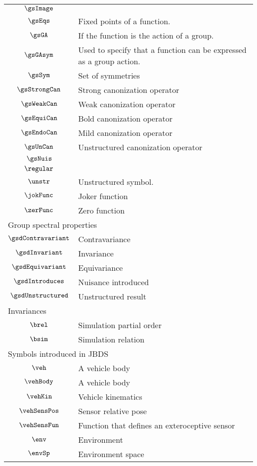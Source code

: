 \begin{longtable}{cl}
 $\gsImage$ &  \\ 
 $\gsEqs$ &  Fixed points of a function.\\ 
 $\gsGA$ &  If the function is the action of a group.\\ 
 $\gsGAsym$ &  Used to specify that a function can be expressed as a group action.\\ 
 $\gsSym$ &  Set of symmetries\\ 
 $\gsStrongCan$ &  Strong canonization operator\\ 
 $\gsWeakCan$ &  Weak canonization operator\\ 
 $\gsEquiCan$ &  Bold canonization operator\\ 
 $\gsEndoCan$ &  Mild canonization operator\\ 
 $\gsUnCan$ &  Unstructured canonization operator\\ 
 $\gsNuis$ &  \\ 
 $\regular$ & \\ 
 $\unstr$ &  Unstructured symbol.\\ 
 $\jokFunc$ &  Joker function\\ 
 $\zerFunc$ &  Zero function\\ 
 \multicolumn{2}{l}{Group spectral properties}\\ 
 \hline
$\gsdContravariant$ &  Contravariance\\ 
 $\gsdInvariant$ &  Invariance\\ 
 $\gsdEquivariant$ &  Equivariance\\ 
 $\gsdIntroduces$ &  Nuisance introduced\\ 
 $\gsdUnstructured$ &  Unstructured result\\ 
 \multicolumn{2}{l}{Invariances}\\ 
 \hline
$\brel$ &  Simulation partial order\\ 
 $\bsim$ &  Simulation relation\\ 
 \multicolumn{2}{l}{Symbols introduced in JBDS}\\ 
 \hline
$\veh$ &  A vehicle body\\ 
 $\vehBody$ &  A vehicle body\\ 
 $\vehKin$ &  Vehicle kinematics \\ 
 $\vehSensPos$ &  Sensor relative pose\\ 
 $\vehSensFun$ &  Function that defines an exteroceptive sensor\\ 
 $\env$ &  Environment\\ 
 $\envSp$ &  Environment space\\ 

\end{longtable}
